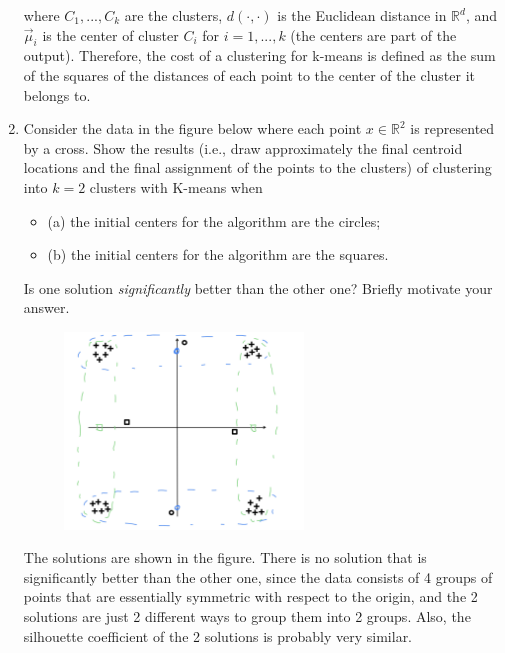 \documentclass[a4paper,11pt,oneside]{book}
\begin{document}
\begin{enumerate}
\begin{solution}
            where $C_1,...,C_k$ are the clusters, $d(\cdot,\cdot)$ is the Euclidean distance in $\mathbb{R}^d$, and $\vec{\mu}_i$ is the center of cluster $C_i$ for $i=1,...,k$ (the centers are part of the output). Therefore, the cost of a clustering for k-means is defined as the sum of the squares of the distances of each point to the center of the cluster it belongs to.
        \end{solution}
    \item Consider the data in the figure below where each point \( x \in \mathbb{R}^2 \) is represented by a cross. Show the results (i.e., draw approximately the final centroid locations and the final assignment of the points to the clusters) of clustering into \( k = 2 \) clusters with K-means when  
        \begin{itemize}
            \item (a) the initial centers for the algorithm are the circles;  
            \item (b) the initial centers for the algorithm are the squares.  
        \end{itemize}
        Is one solution \textit{significantly} better than the other one? Briefly motivate your answer.
        \begin{figure}[H]
            \centering
            \includegraphics[width=0.6\textwidth,height=0.6\textheight,keepaspectratio]{images/4_7_Feb_2020.png}
        \end{figure}
        \begin{solution}
            The solutions are shown in the figure. There is no solution that is significantly better than the other one, since the data consists of 4 groups of points that are essentially symmetric with respect to the origin, and the 2 solutions are just 2 different ways to group them into 2 groups. Also, the silhouette coefficient of the 2 solutions is probably very similar.
            \begin{figure}[H]

\end{figure}
\end{solution}
\end{enumerate}
\end{document}
